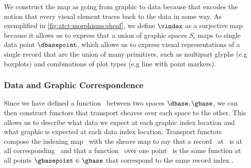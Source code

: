 \documentclass[journal]{IEEEtran}
\theoremstyle{definition}
\theoremstyle{remark}
\begin{document}
We construct the map as going from graphic to data because that encodes the notion that every visual element traces back to the data in some way. As exemplified in \autoref{fig:atct:morphisms:sheaf}, we define $\vindex$ as a surjective map because it allows us to express that a union of graphic spaces $S_i$ maps to single data point $\dbasepoint$, which allows us to express visual representations of a single record that are the union of many primitives, such as multipart glyphs (e.g boxplots) and combinations of plot types (e.g line with point markers).

\subsubsection{Data and Graphic Correspondence}
Since we have defined a function \vindex\ between two spaces $\dbase, \gbase$, we can then construct functors that transport sheaves over each space to the other\cite{harder2008lectures}. This allows us to describe what data we expect at each graphic index location and what graphic is expected at each data index location. Transport functors compose the indexing map \vindex\ with the sheave map to say that a record \dsection\ at \dbasepoint\ is at all corresponding \gbasepoint\ and that a function \gsection\ over one point \gbasepoint\ is the same function at all points $\gbasepoint \in \gbase$ that correspond to the same record index \dbasepoint.
\end{document}
